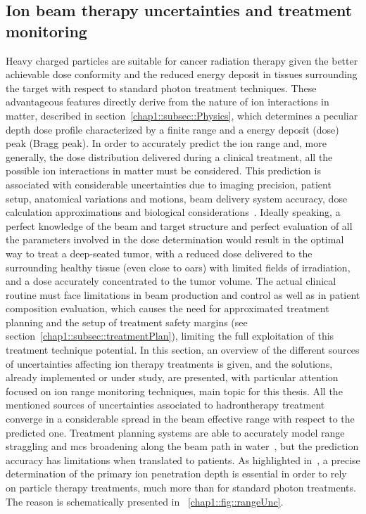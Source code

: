 \subsection{Ion beam therapy uncertainties and treatment monitoring}\label{chap1::subsec::uncertainty}
Heavy charged particles are suitable for cancer radiation therapy given the better achievable dose conformity and the reduced energy deposit in tissues surrounding the target with respect to standard photon treatment techniques. These advantageous features directly derive from the nature of ion interactions in matter, described in section~\ref{chap1::subsec::Physics}, which determines a peculiar depth dose profile characterized by a finite range and a energy deposit (dose) peak (Bragg peak). In order to accurately predict the ion range and, more generally, the dose distribution delivered during a clinical treatment, all the possible ion interactions in matter must be considered. This prediction is associated with considerable uncertainties due to imaging precision, patient setup, anatomical variations and motions, beam delivery system accuracy, dose calculation approximations and biological considerations~\parencite{Paganetti2012}. Ideally speaking, a perfect knowledge of the beam and target structure and perfect evaluation of all the parameters involved in the dose determination would result in the optimal way to treat a deep-seated tumor, with a reduced dose delivered to the surrounding healthy tissue (even close to \glspl{oar}) with limited fields of irradiation, and a dose accurately concentrated to the tumor volume. The actual clinical routine must face limitations in beam production and control as well as in patient composition evaluation, which causes the need for approximated treatment planning and the setup of treatment safety margins (see section~\ref{chap1::subsec::treatmentPlan}), limiting the full exploitation of this treatment technique potential. In this section, an overview of the different sources of uncertainties affecting ion therapy treatments is given, and the solutions, already implemented or under study, are presented, with particular attention focused on ion range monitoring techniques, main topic for this thesis.
All the mentioned sources of uncertainties associated to hadrontherapy treatment converge in a considerable spread in the beam effective range with respect to the predicted one. Treatment planning systems are able to accurately model range straggling and \gls{mcs} broadening along the beam path in water~\parencite{Hong1996}, but the prediction accuracy has limitations when translated to patients. As highlighted in~\cite{Schlegel2008}, a precise determination of the primary ion penetration depth is essential in order to rely on particle therapy treatments, much more than for standard photon treatments. The reason is schematically presented in \figurename~\ref{chap1::fig::rangeUnc}.

